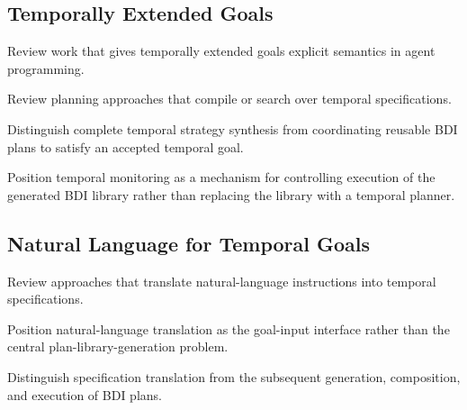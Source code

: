 \subsection{Temporally Extended Goals}

Review work that gives temporally extended goals explicit semantics in agent programming.

Review planning approaches that compile or search over temporal specifications.

Distinguish complete temporal strategy synthesis from coordinating reusable BDI plans to satisfy an accepted temporal goal.

Position temporal monitoring as a mechanism for controlling execution of the generated BDI library rather than replacing the library with a temporal planner.


\subsection{Natural Language for Temporal Goals}

Review approaches that translate natural-language instructions into temporal specifications.

Position natural-language translation as the goal-input interface rather than the central plan-library-generation problem.

Distinguish specification translation from the subsequent generation, composition, and execution of BDI plans.
